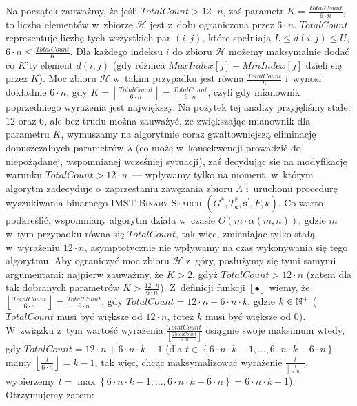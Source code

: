 Na początek zauważmy, że jeśli $TotalCount > 12 \cdot n$, zaś parametr $K = \frac{TotalCount}{6 \cdot n}$, to liczba elementów w~zbiorze $\mathcal{H}$ jest z~dołu ograniczona przez $6 \cdot n$.
$TotalCount$ reprezentuje liczbę tych wszystkich par $\left( i, j \right)$, które spełniają $L \leqslant d \left( i, j \right) \leqslant U$, $6 \cdot n \leqslant \frac{TotalCount}{K}$.
Dla każdego indeksu $i$ do zbioru $\mathcal{H}$ możemy maksymalnie dodać co $K$'ty element $d \left( i, j \right)$ (gdy różnica $MaxIndex \left[ j \right] - MinIndex \left[ j \right]$ dzieli się przez $K$).
Moc zbioru $\mathcal{H}$ w~takim przypadku jest równa $\frac{TotalCount}{K}$ i~wynosi dokładnie $6 \cdot n$, gdy $K = \left\lfloor \frac{TotalCount}{6 \cdot n} \right\rfloor = \frac{TotalCount}{6 \cdot n}$, czyli gdy mianownik poprzedniego wyrażenia jest największy. 
Na pożytek tej analizy przyjęliśmy stałe: $12$ oraz $6$, ale bez trudu można zauważyć, że zwiększając mianownik dla parametru $K$, wymuszamy na algorytmie coraz gwałtowniejszą eliminację dopuszczalnych parametrów $\lambda$ (co może w~konsekwencji prowadzić do niepożądanej, wspomnianej wcześniej sytuacji), zaś decydując się na modyfikację warunku $TotalCount > 12 \cdot n$~--- wpływamy tylko na moment, w~którym algorytm zadecyduje o~zaprzestaniu zawężania zbioru $\Lambda$ i~uruchomi procedurę wyszukiwania binarnego \textsc{IMST-Binary-Search} $\left( G^{\ast}, T^{\ast}_{\textbf{s}}, \textbf{s}^{\prime}, F, k \right)$.
Co warto podkreślić, wspomniany algorytm działa w~czasie $O \left( m \cdot \alpha \left( m, n \right) \right)$, gdzie $m$ w~tym przypadku równa się $TotalCount$, tak więc, zmieniając tylko stałą w~wyrażeniu $12 \cdot n$, asymptotycznie nie wpływamy na czas wykonywania się tego algorytmu.
Aby ograniczyć moc zbioru $\mathcal{H}$ z~góry, posłużymy się tymi samymi argumentami: najpierw zauważmy, że $K > 2$, gdyż $TotalCount > 12 \cdot n$ (zatem dla tak dobranych parametrów $K > \frac{12 \cdot n}{6 \cdot n}$).
Z~definicji funkcji $\left\lfloor \bullet \right\rfloor$ wiemy, że $\left\lfloor \frac{TotalCount}{6 \cdot n} \right\rfloor = \frac{TotalCount}{6 \cdot n}$, gdy $TotalCount = 12 \cdot n + 6 \cdot n \cdot k$, gdzie $k \in \mathbb{N}^{+}$ ($TotalCount$ musi być większe od $12 \cdot n$, toteż $k$ musi być większe od $0$).
W~związku z~tym wartość wyrażenia $\frac{TotalCount}{\left\lfloor \frac{TotalCount}{6 \cdot n} \right\rfloor}$ osiągnie swoje maksimum wtedy, gdy $TotalCount = 12 \cdot n + 6 \cdot n \cdot k - 1$ (dla $t \in \left\{ 6 \cdot n \cdot k - 1, \dots, 6 \cdot n \cdot k - 6 \cdot n \right\}$ mamy $\left\lfloor \frac{t}{6 \cdot n} \right\rfloor = k - 1$, tak więc, chcąc maksymalizować wyrażenie $\frac{t}{\left\lfloor \frac{t}{6 \cdot n} \right\rfloor}$, wybierzemy $t = \max \left\{ 6 \cdot n \cdot k - 1, \dots, 6 \cdot n \cdot k - 6 \cdot n \right\} = 6 \cdot n \cdot k - 1$).
Otrzymujemy zatem:

